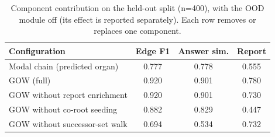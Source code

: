 \begin{table}[t]
\centering
\caption{Component contribution on the held-out split (n=400), with the OOD module off (its effect is reported separately). Each row removes or replaces one component.}
\label{tab:ablation}
\begin{tabular}{lccc}
\toprule
Configuration & Edge F1 & Answer sim. & Report \\
\midrule
Modal chain (predicted organ) & 0.777 & 0.778 & 0.555 \\
GOW (full) & 0.920 & 0.901 & 0.780 \\
GOW without report enrichment & 0.920 & 0.901 & 0.730 \\
GOW without co-root seeding & 0.882 & 0.829 & 0.447 \\
GOW without successor-set walk & 0.694 & 0.534 & 0.732 \\
\bottomrule
\end{tabular}
\end{table}
